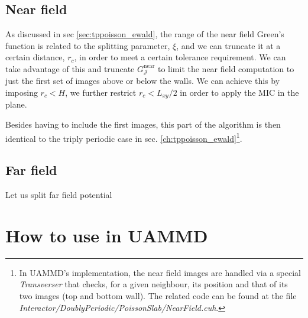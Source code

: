 \documentclass[ twoside,openright,titlepage,numbers=noenddot,%
headinclude,footinclude,cleardoublepage=empty,abstract=on,
BCOR=5mm,paper=a4,fontsize=11pt, dvipsnames
]{scrreprt}
\newcommand{\oper}[1]{\mathcal{#1}}
\newcommand{\uammd}{\gls{UAMMD}\xspace}
\newcommand{\near}{\textrm{near}}
\begin{document}
\subsection{Near field}
As discussed in sec \ref{sec:tppoisson_ewald}, the range of the near field Green's function is related to the splitting parameter, $\xi$, and we can truncate it at a certain distance, $r_{c}$, in order to meet a certain tolerance requirement. We can take advantage of this and truncate $G_{\oper{J}}^{\near}$ to limit the near field computation to just the first set of images above or below the walls. We can achieve this by imposing $r_c<H$, we further restrict $r_c < L_{xy}/2$ in order to apply the \gls{MIC} in the plane.

Besides having to include the first images, this part of the algorithm is then identical to the triply periodic case in sec. \ref{ch:tppoisson_ewald}\footnote{In \uammd's implementation, the near field images are handled via a special \emph{Transverser} that checks, for a given neighbour, its position and that of its two images (top and bottom wall). The related code can be found at the file \emph{Interactor/DoublyPeriodic/PoissonSlab/NearField.cuh}.}.
\subsection{Far field}

Let us split far field potential

\section{How to use in UAMMD}
\end{document}
